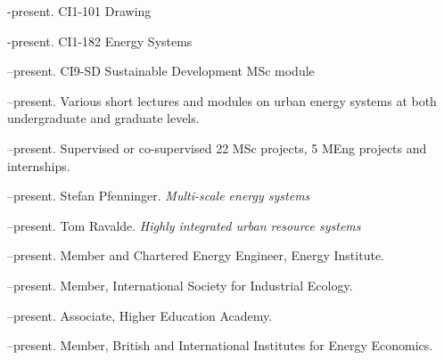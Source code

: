 \documentclass[11pt,a4paper]{article}
\begin{document}
\noindent{}%
%
-present.  CI{1-101} Drawing

-present.  CI{1-182} Energy Systems

--present.  CI{9-SD} Sustainable Development MSc module

--present. Various short lectures and modules on urban energy systems at both undergraduate and graduate levels.
 
--present. Supervised or co-supervised 22 MSc projects, 5 MEng projects and internships.

\bigskip
\noindent{}%
--present.  Stefan Pfenninger. \emph{Multi-scale energy systems}

--present.  Tom Ravalde. \emph{Highly integrated urban resource systems}


\bigskip

\noindent{}%
%
--present.  Member and Chartered Energy Engineer, Energy Institute.

--present.  Member, International Society for Industrial Ecology.

--present.  Associate, Higher Education Academy.

--present.  Member, British and International Institutes for Energy Economics.
\end{document}
